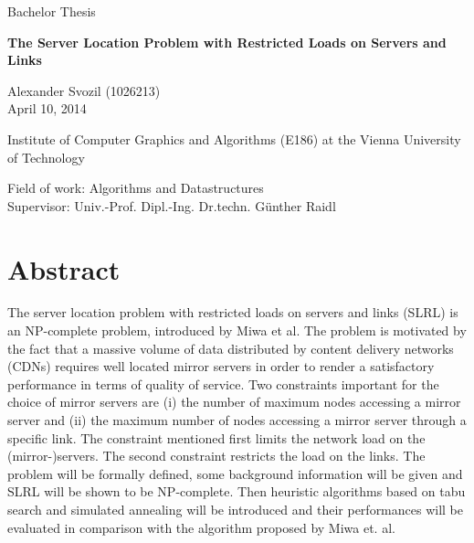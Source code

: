 \documentclass [12pt]{article}
\begin{document}
\vspace{20pt}
\begin{center}
  \fontsize{45pt}{25pt}\selectfont Bachelor Thesis 
\end{center}
\vspace{50pt}
\begin{center}
  \fontsize{55pt}{30pt}\selectfont\textbf{The Server Location Problem with Restricted Loads on Servers and Links} 
\end{center}
\vspace{50pt}

\begin{center}
\large Alexander Svozil (1026213)\\April 10, 2014
\end{center}
\vspace{20pt}
\begin{center}
\large Institute of Computer Graphics and Algorithms (E186) at the Vienna University of Technology 
\end{center}
\vspace{20pt}
\begin{center}
\large Field of work: Algorithms and Datastructures \\ Supervisor: Univ.-Prof. Dipl.-Ing. Dr.techn. Günther Raidl \\
\end{center}
\thispagestyle{empty}
\newpage


\section*{Abstract}
The server location problem with restricted loads on servers and links (SLRL) is an NP-complete
problem, introduced by Miwa et al. The problem 
is motivated by the fact that a massive volume of data distributed by content delivery networks (CDNs) 
requires well located mirror servers in order to render a satisfactory performance in terms of quality of service.
Two constraints important for the choice of mirror servers are (i) the number of maximum nodes
accessing a mirror server and (ii) the maximum number of nodes accessing a mirror server 
through a specific link. The constraint mentioned first limits the network load on
the (mirror-)servers. The second constraint restricts the load on the links.
The problem will be formally defined, some background information will be given and SLRL will be shown to be NP-complete.
Then heuristic algorithms based on tabu search and simulated annealing will be introduced and their performances will be evaluated in comparison with the algorithm proposed 
by Miwa et. al. 
\end{document}
